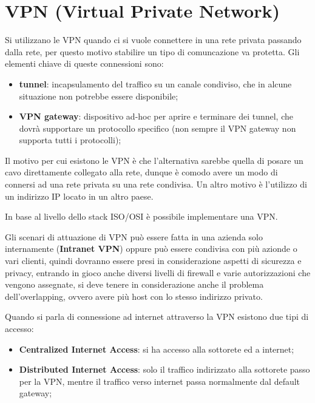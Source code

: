 \documentclass[12pt]{article}
\begin{document}
\section{VPN (Virtual Private Network)}
Si utilizzano le VPN quando ci si vuole connettere in una rete privata passando dalla rete, per questo motivo stabilire un tipo di comuncazione va protetta. Gli elementi chiave di queste connessioni sono:
\begin{itemize}
    \item \textbf{tunnel}: incapsulamento del traffico su un canale condiviso, che in alcune situazione non potrebbe essere disponibile;
    \item \textbf{VPN gateway}: dispositivo ad-hoc per aprire e terminare dei tunnel, che dovr\`a supportare un protocollo specifico (non sempre il VPN gateway non supporta tutti i protocolli);
\end{itemize}
Il motivo per cui esistono le VPN \`e che l'alternativa sarebbe quella di posare un cavo direttamente collegato alla rete, dunque \`e comodo avere un modo di connersi ad una rete privata su una rete condivisa. Un altro motivo \`e l'utilizzo di un indirizzo IP locato in un altro paese.

In base al livello dello stack ISO/OSI \`e possibile implementare una VPN.

Gli scenari di attuazione di VPN pu\`o essere fatta in una azienda solo internamente (\textbf{Intranet VPN}) oppure pu\`o essere condivisa con pi\`u azionde o vari clienti, quindi dovranno essere presi in considerazione aspetti di sicurezza e privacy, entrando in gioco anche diversi livelli di firewall e varie autorizzazioni che vengono assegnate, si deve tenere in considerazione anche il problema dell'overlapping, ovvero avere pi\`u host con lo stesso indirizzo privato.

Quando si parla di connessione ad internet attraverso la VPN esistono due tipi di accesso:
\begin{itemize}
    \item \textbf{Centralized Internet Access}: si ha accesso alla sottorete ed a internet;
    \item \textbf{Distributed Internet Access}: solo il traffico indirizzato alla sottorete passo per la VPN, mentre il traffico verso internet passa normalmente dal default gateway;
\end{itemize}
\end{document}
